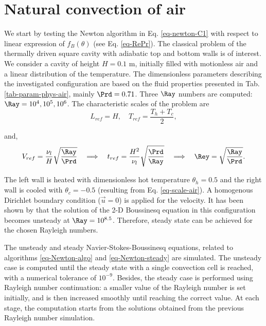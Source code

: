 \section{Natural convection of air}\label{sec: natconv-air-2D}
We start by testing the Newton algorithm in Eq. \ref{eq-newton-C1} with respect to linear expression of $f_B(\theta)$  (see Eq. \ref{eq-RePr}). %
The classical problem of the thermally driven square cavity with adiabatic top and bottom walls is of interest.
We consider a cavity of height $H = 0.1$ m, initially filled with motionless air and a linear distribution of the temperature. 
The dimensionless parameters describing the investigated configuration are based on the fluid properties presented in Tab. \ref{tab-param-phys-air}, mainly $\Prd = 0.71$.
Three $\Ray$ numbers are computed: $\Ray = 10^4, 10^5, 10^6$. 
The characteristic scales of the problem are 
\begin{equation} \label{eq-scale-air}
	L_{ref} = H, \quad T_{ref} = \frac{T_h + T_c}{2},
\end{equation}

\noindent and,
\begin{equation} \label{eq-scaling-3}
   V_{ref} = \frac{\nu_l}{H} \sqrt{\frac{\Ray}{\Prd}} 
   \quad \Longrightarrow \quad t_{ref} = \frac{H^2}{\nu_l} \sqrt{\frac{\Prd}{\Ray}} 
   \quad \Longrightarrow \quad \Rey = \sqrt{\frac{\Ray}{\Prd}}.
\end{equation} 

\noindent The left wall is heated with dimensionless hot temperature $\theta_h = 0.5$ and the right wall is cooled with $\theta_c = -0.5$ (resulting from Eq. \ref{eq-scale-air}). 
A homogenous Dirichlet boundary condition ($\vec u = 0$) is applied for the velocity.
It has been shown by \cite{LeQuere91} that the solution of the 2-D Boussinesq equation in this configuration becomes unsteady at $\Ray= 10^{8.5}$.
Therefore, steady state can be achieved for the chosen Rayleigh numbers.

The unsteady  and steady Navier-Stokes-Boussinesq equations, related to algorithms \ref{eq-Newton-algo} and \ref{eq-Newton-steady} are simulated.
The unsteady case is computed until the steady state with a single convection cell is reached, with a numerical tolerance of $10^{-9}$.
Besides, the steady case is performed using Rayleigh number continuation:
a smaller value of the Rayleigh number is set initially, and is then increased smoothly until reaching the correct value.
At each stage, the computation starts from the solutions obtained from the previous Rayleigh number simulation.

